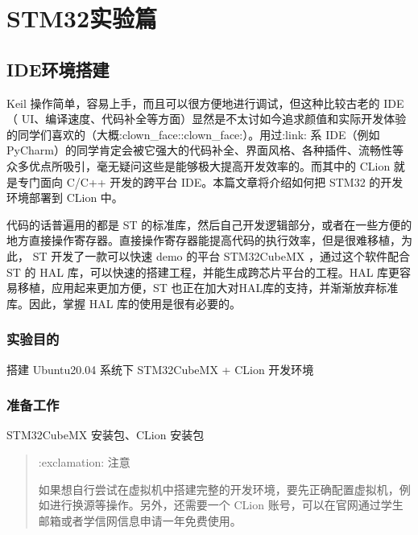 \documentclass[a4paper,12pt,english]{sphinxmanual}
\begin{document}
\sphinxstepscope


\chapter{STM32实验篇}
\label{\detokenize{exp-stm32/index:stm32}}\label{\detokenize{exp-stm32/index::doc}}
\sphinxstepscope


\section{IDE环境搭建}
\label{\detokenize{exp-stm32/ide-setup:ide}}\label{\detokenize{exp-stm32/ide-setup::doc}}
\sphinxAtStartPar
Keil 操作简单，容易上手，而且可以很方便地进行调试，但这种比较古老的 IDE（ UI、编译速度、代码补全等方面）显然是不太讨如今追求颜值和实际开发体验的同学们喜欢的（大概:clown\_face::clown\_face:）。用过:link:  系 IDE（例如PyCharm）的同学肯定会被它强大的代码补全、界面风格、各种插件、流畅性等众多优点所吸引，毫无疑问这些是能够极大提高开发效率的。而其中的 CLion 就是专门面向 C/C++ 开发的跨平台 IDE。本篇文章将介绍如何把 STM32 的开发环境部署到 CLion 中。

\sphinxAtStartPar
代码的话普遍用的都是 ST 的标准库，然后自己开发逻辑部分，或者在一些方便的地方直接操作寄存器。直接操作寄存器能提高代码的执行效率，但是很难移植，为此， ST 开发了一款可以快速 demo 的平台 STM32CubeMX ，通过这个软件配合 ST 的 HAL 库，可以快速的搭建工程，并能生成跨芯片平台的工程。HAL 库更容易移植，应用起来更加方便，ST 也正在加大对HAL库的支持，并渐渐放弃标准库。因此，掌握 HAL 库的使用是很有必要的。


\subsection{实验目的}
\label{\detokenize{exp-stm32/ide-setup:id1}}
\sphinxAtStartPar
搭建 Ubuntu20.04 系统下 STM32CubeMX + CLion 开发环境


\subsection{准备工作}
\label{\detokenize{exp-stm32/ide-setup:id2}}
\sphinxAtStartPar
STM32CubeMX 安装包、CLion 安装包
\begin{quote}

\sphinxAtStartPar
:exclamation: 注意

\sphinxAtStartPar
如果想自行尝试在虚拟机中搭建完整的开发环境，要先正确配置虚拟机，例如进行换源等操作。另外，还需要一个 CLion 账号，可以在官网通过学生邮箱或者学信网信息申请一年免费使用。
\end{quote}
\end{document}
